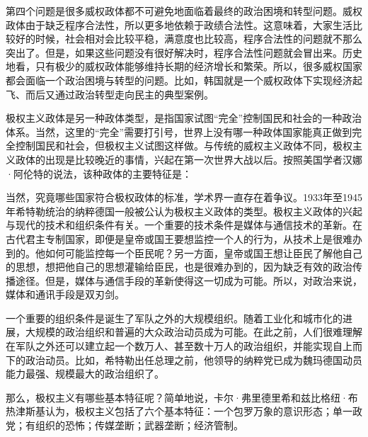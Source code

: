 第四个问题是很多威权政体都不可避免地面临着最终的政治困境和转型问题。威权政体由于缺乏程序合法性，所以更多地依赖于政绩合法性。这意味着，大家生活比较好的时候，社会相对会比较平稳，满意度也比较高，程序合法性的问题就不那么突出了。但是，如果这些问题没有很好解决时，程序合法性问题就会冒出来。历史地看，只有极少的威权政体能够维持长期的经济增长和繁荣。所以，很多威权国家都会面临一个政治困境与转型的问题。比如，韩国就是一个威权政体下实现经济起飞、而后又通过政治转型走向民主的典型案例。


极权主义政体是另一种政体类型，是指国家试图“完全”控制国民和社会的一种政治体系。当然，这里的“完全”需要打引号，世界上没有哪一种政体国家能真正做到完全控制国民和社会，但极权主义试图这样做。与传统的威权主义政体不同，极权主义政体的出现是比较晚近的事情，兴起在第一次世界大战以后。按照美国学者汉娜·阿伦特的说法，该种政体的主要特征是：


当然，究竟哪些国家符合极权政体的标准，学术界一直存在着争议。1933年至1945年希特勒统治的纳粹德国一般被公认为极权主义政体的类型。极权主义政体的兴起与现代的技术和组织条件有关。一个重要的技术条件是媒体与通信技术的革新。在古代君主专制国家，即便是皇帝或国王要想监控一个人的行为，从技术上是很难办到的。他如何可能监控每一个臣民呢？另一方面，皇帝或国王想让臣民了解他自己的思想，想把他自己的思想灌输给臣民，也是很难办到的，因为缺乏有效的政治传播途径。但是，媒体与通信手段的革新使得这一切成为可能。所以，对政治来说，媒体和通讯手段是双刃剑。

一个重要的组织条件是诞生了军队之外的大规模组织。随着工业化和城市化的进展，大规模的政治组织和普遍的大众政治动员成为可能。在此之前，人们很难理解在军队之外还可以建立起一个数万人、甚至数十万人的政治组织，并能实现自上而下的政治动员。比如，希特勒出任总理之前，他领导的纳粹党已成为魏玛德国动员能力最强、规模最大的政治组织了。

那么，极权主义有哪些基本特征呢？简单地说，卡尔·弗里德里希和兹比格纽·布热津斯基认为，极权主义包括了六个基本特征：一个包罗万象的意识形态；单一政党；有组织的恐怖；传媒垄断；武器垄断；经济管制。

